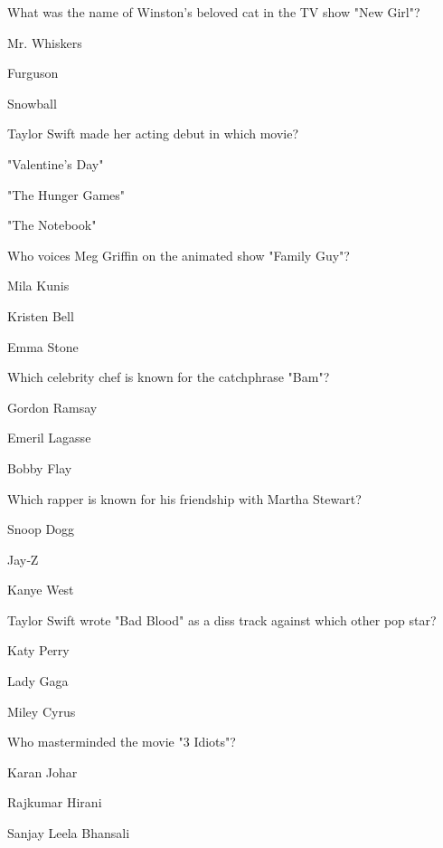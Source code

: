 \begin{enhancedmcq}{What was the name of Winston's beloved cat in the TV show "New Girl"?}
\item Mr. Whiskers
\item Furguson
\item Snowball

\end{enhancedmcq}
\begin{enhancedmcq}{Taylor Swift made her acting debut in which movie?}
\item "Valentine's Day"
\item "The Hunger Games"
\item "The Notebook"

\end{enhancedmcq}
\begin{enhancedmcq}{Who voices Meg Griffin on the animated show "Family Guy"?}
\item Mila Kunis
\item Kristen Bell
\item Emma Stone

\end{enhancedmcq}
\begin{enhancedmcq}{Which celebrity chef is known for the catchphrase "Bam"?}
\item Gordon Ramsay
\item Emeril Lagasse
\item Bobby Flay

\end{enhancedmcq}
\begin{enhancedmcq}{Which rapper is known for his friendship with Martha Stewart?}
\item Snoop Dogg
\item Jay‑Z
\item Kanye West

\end{enhancedmcq}
\begin{enhancedmcq}{Taylor Swift wrote "Bad Blood" as a diss track against which other pop star?}
\item Katy Perry
\item Lady Gaga
\item Miley Cyrus

\end{enhancedmcq}
\begin{enhancedmcq}{Who masterminded the movie "3 Idiots"?}
\item Karan Johar
\item Rajkumar Hirani
\item Sanjay Leela Bhansali

\end{enhancedmcq}
